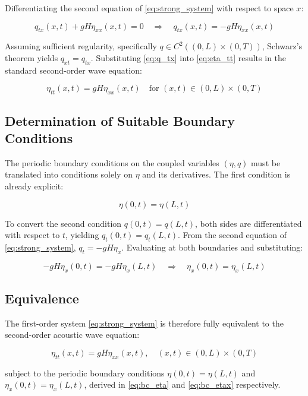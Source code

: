 Differentiating the second equation of \eqref{eq:strong_system} with respect to space \(x\):

\begin{equation}
q_{tx}(x,t) + gH\eta_{xx}(x,t) = 0 \quad \Longrightarrow \quad q_{tx}(x,t) = -gH\eta_{xx}(x,t)
\label{eq:q_tx}
\end{equation}

Assuming sufficient regularity, specifically \(q \in C^2((0,L)\times(0,T))\), Schwarz's theorem yields \(q_{xt} = q_{tx}\). Substituting \eqref{eq:q_tx} into \eqref{eq:eta_tt} results in the standard second-order wave equation:

\begin{equation}
\eta_{tt}(x,t) = gH\eta_{xx}(x,t) \quad \text{for } (x,t)\in(0,L)\times(0,T)
\label{eq:wave_eq}
\end{equation}

\subsection{Determination of Suitable Boundary Conditions}

The periodic boundary conditions on the coupled variables \((\eta, q)\) must be translated into conditions solely on \(\eta\) and its derivatives. The first condition is already explicit:

\begin{equation}
\eta(0,t) = \eta(L,t)
\label{eq:bc_eta}
\end{equation}

To convert the second condition \(q(0,t) = q(L,t)\), both sides are differentiated
with respect to \(t\), yielding \(q_{t}(0,t) = q_{t}(L,t)\). From the second equation of \eqref{eq:strong_system}, \(q_{t} = -gH\eta_{x}\). Evaluating at both boundaries and substituting:

\begin{equation}
-gH\eta_{x}(0,t) = -gH\eta_{x}(L,t) \quad \Longrightarrow \quad \eta_{x}(0,t) = \eta_{x}(L,t)
\label{eq:bc_etax}
\end{equation}

\subsection{Equivalence}

The first-order system \eqref{eq:strong_system} is therefore fully equivalent to the second-order acoustic wave equation:

\begin{equation}
\eta_{tt}(x,t) = gH\eta_{xx}(x,t), \quad (x,t)\in(0,L)\times(0,T)
\end{equation}

subject to the periodic boundary conditions \(\eta(0,t) = \eta(L,t)\) and \(\eta_{x}(0,t) = \eta_{x}(L,t)\), derived in \eqref{eq:bc_eta} and \eqref{eq:bc_etax} respectively.